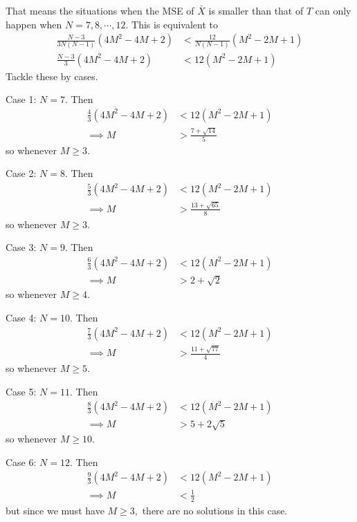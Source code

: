 \documentclass{article}
\begin{document}
\begin{enumerate}
\begin{enumerate}[(a)]
				That means the situations when the MSE of $\bar{X}$ is smaller than that of $T$ can only happen when $N=7, 8, \cdots, 12.$ This is equivalent to 
				\begin{align*}
					\frac{N-3}{3N(N-1)}(4M^2-4M+2) &< \frac{12}{N(N-1)}(M^2-2M+1) \\
					\frac{N-3}{3}(4M^2-4M+2) &< 12(M^2-2M+1)
				\end{align*} Tackle these by cases.

				Case 1: $N=7.$ Then
				\begin{align*}
					\frac{4}{3}(4M^2-4M+2) &< 12(M^2-2M+1) \\
					\implies M &>\frac{7+\sqrt{14}}{5} 
				\end{align*} so whenever $M\ge 3.$

				Case 2: $N=8.$ Then
				\begin{align*}
					\frac{5}{3}(4M^2-4M+2) &< 12(M^2-2M+1) \\
					\implies M &> \frac{13+\sqrt{65}}{8} 
				\end{align*} so whenever $M\ge 3.$

				Case 3: $N=9.$ Then
				\begin{align*}
					\frac{6}{3}(4M^2-4M+2) &< 12(M^2-2M+1) \\ 
					\implies M &> 2+\sqrt{2}
				\end{align*} so whenever $M\ge 4.$

				Case 4: $N=10.$ Then 
				\begin{align*}
					\frac{7}{3}(4M^2-4M+2) &< 12(M^2-2M+1) \\
					\implies M &> \frac{11+\sqrt{77}}{4}
				\end{align*} so whenever $M\ge 5.$

				Case 5: $N=11.$ Then 
				\begin{align*}
					\frac{8}{3}(4M^2-4M+2) &< 12(M^2-2M+1) \\
					\implies M &> 5+2\sqrt{5}
				\end{align*} so whenever $M\ge 10.$

				Case 6: $N=12.$ Then
				\begin{align*}
					\frac{9}{3}(4M^2-4M+2) &< 12(M^2-2M+1) \\
					\implies M &< \frac{1}{2}
				\end{align*} but since we must have $M\ge 3,$ there are no solutions in this case.

		\end{enumerate}


\end{enumerate}
\end{document}
